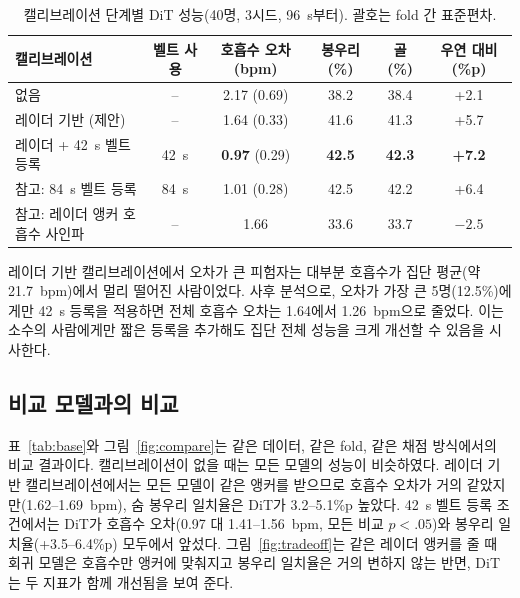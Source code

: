 \documentclass{article}
\begin{document}
\begin{table}[t]
\centering
\caption{캘리브레이션 단계별 DiT 성능(40명, 3시드, 96~s부터). 괄호는 fold 간 표준편차.}
\label{tab:tier}
\begin{tabular}{lccccc}
\toprule
캘리브레이션 & 벨트 사용 & 호흡수 오차 (bpm) & 봉우리 (\%) & 골 (\%) & 우연 대비 (\%p) \\
\midrule
없음 & -- & 2.17 (0.69) & 38.2 & 38.4 & +2.1 \\
레이더 기반 (제안) & -- & 1.64 (0.33) & 41.6 & 41.3 & +5.7 \\
레이더 + 42~s 벨트 등록 & 42~s & \textbf{0.97} (0.29) & \textbf{42.5} & \textbf{42.3} & \textbf{+7.2} \\
\midrule
참고: 84~s 벨트 등록 & 84~s & 1.01 (0.28) & 42.5 & 42.2 & +6.4 \\
참고: 레이더 앵커 호흡수 사인파 & -- & 1.66 & 33.6 & 33.7 & $-2.5$ \\
\bottomrule
\end{tabular}
\end{table}

레이더 기반 캘리브레이션에서 오차가 큰 피험자는 대부분 호흡수가 집단 평균(약 21.7~bpm)에서 멀리 떨어진 사람이었다.
사후 분석으로, 오차가 가장 큰 5명(12.5\%)에게만 42~s 등록을 적용하면 전체 호흡수 오차는 1.64에서 1.26~bpm으로 줄었다.
이는 소수의 사람에게만 짧은 등록을 추가해도 집단 전체 성능을 크게 개선할 수 있음을 시사한다.

\subsection{비교 모델과의 비교}
표~\ref{tab:base}와 그림~\ref{fig:compare}는 같은 데이터, 같은 fold, 같은 채점 방식에서의 비교 결과이다.
캘리브레이션이 없을 때는 모든 모델의 성능이 비슷하였다.
레이더 기반 캘리브레이션에서는 모든 모델이 같은 앵커를 받으므로 호흡수 오차가 거의 같았지만(1.62--1.69~bpm), 숨 봉우리 일치율은 DiT가 3.2--5.1\%p 높았다.
42~s 벨트 등록 조건에서는 DiT가 호흡수 오차(0.97 대 1.41--1.56~bpm, 모든 비교 $p<.05$)와 봉우리 일치율(+3.5--6.4\%p) 모두에서 앞섰다.
그림~\ref{fig:tradeoff}는 같은 레이더 앵커를 줄 때 회귀 모델은 호흡수만 앵커에 맞춰지고 봉우리 일치율은 거의 변하지 않는 반면, DiT는 두 지표가 함께 개선됨을 보여 준다.
\end{document}
